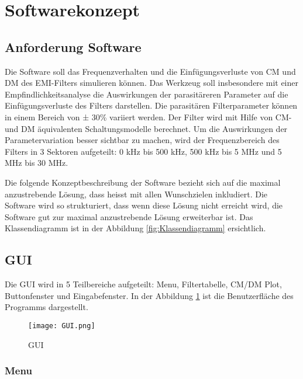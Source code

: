 \section{Softwarekonzept} \label{sec:softwarekonzept}

\subsection{Anforderung Software} \label{subsec:anforderungSoftware}

Die Software soll das Frequenzverhalten und die Einfügungsverluste von CM und DM des EMI-Filters simulieren können. Das Werkzeug soll insbesondere mit einer Empfindlichkeitsanalyse die Auswirkungen der parasitäreren Parameter auf die Einfügungsverluste des Filters darstellen. Die parasitären Filterparameter können in einem Bereich von ± 30\% variiert werden. Der Filter wird mit Hilfe von CM- und DM äquivalenten Schaltungsmodelle berechnet. Um die Auswirkungen der Parametervariation besser sichtbar zu machen, wird der Frequenzbereich des Filters in 3 Sektoren aufgeteilt: 0 kHz bis 500 kHz, 500 kHz bis 5 MHz und 5 MHz bis 30 MHz. 

Die folgende Konzeptbeschreibung der Software bezieht sich auf die maximal anzustrebende Lösung, dass heisst mit allen Wunschzielen inkludiert. Die Software wird so strukturiert, dass wenn diese Lösung nicht erreicht wird, die Software gut zur  maximal anzustrebende Lösung erweiterbar ist. Das Klassendiagramm ist in der Abbildung \ref{fig:Klassendiagramm}  ersichtlich.



\subsection{GUI} \label{subsec:GUI}

Die GUI wird in 5 Teilbereiche aufgeteilt: Menu, Filtertabelle, CM/DM Plot, Buttonfenster und Eingabefenster. In der Abbildung \ref{fig:GUI}  ist die Benutzerfläche des Programms dargestellt.

\begin{figure}[H]
	\centering
	\texttt{[image: GUI.png]}
	\caption{GUI}
	\label{fig:GUI}
\end{figure}

\newpage

\subsubsection{Menu} \label{subsubsec:menu}

